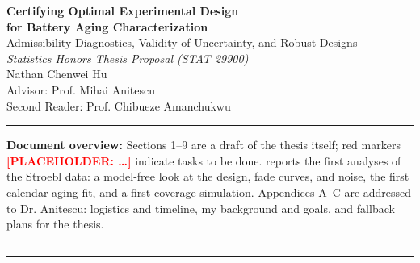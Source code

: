 \documentclass[11pt,letterpaper]{article}
\newcommand{\ph}[1]{\textcolor{red}{\textbf{[PLACEHOLDER: #1]}}}
\begin{document}
\begin{center}
  {\LARGE\bfseries Certifying Optimal Experimental Design\\[0.2em] for Battery Aging Characterization}\\[0.6em]
  {\large Admissibility Diagnostics, Validity of Uncertainty, and Robust Designs}\\[0.8em]
  {\itshape Statistics Honors Thesis Proposal (STAT 29900)}\\[0.4em]
  {\small Nathan Chenwei Hu}\\[0.4em]
  {\small Advisor: Prof. Mihai Anitescu}\\[0.4em]
  {\small Second Reader: Prof. Chibueze Amanchukwu}\\[0.4em]
\end{center}

\begin{abstract}
\noindent Model-based optimal experimental design (OED) promises to make battery aging campaigns, among the slowest and most expensive experiments in battery research, more informative per cell. The first prospective test on real cells, a 279-cell two-stage study by Stroebl et al., gave a split result: OED reduced the uncertainty of a targeted calendar-aging parameter by 28\% but increased the uncertainty of targeted cycle-aging parameters by more than an order of magnitude. This thesis asks whether such outcomes can be predicted in advance and prevented by design. Using public aging datasets, it (i) constructs admissibility diagnostics from pilot data (identifiability, model adequacy, and noise structure) and tests whether they anticipate the observed success and failure; (ii) measures the coverage of bootstrap, Fisher-information, and profile-likelihood intervals at realistic campaign sizes; and (iii) evaluates compromise, Bayesian, and maximin designs that hedge against model error. The intended outcome is a practitioner checklist for when OED can be trusted.
\end{abstract}

\vspace{0.3em}\hrule\vspace{0.4em}
{\small \textbf{Document overview:} Sections 1--9 are a draft of the thesis itself; red markers \ph{\ldots} indicate tasks to be done.  reports the first analyses of the Stroebl data: a model-free look at the design, fade curves, and noise, the first calendar-aging fit, and a first coverage simulation. Appendices A--C are addressed to Dr. Anitescu: logistics and timeline, my background and goals, and fallback plans for the thesis.}
\vspace{0.3em}\hrule
{\small\tableofcontents}
\vspace{0.4em}\hrule\vspace{0.8em}
\end{document}

